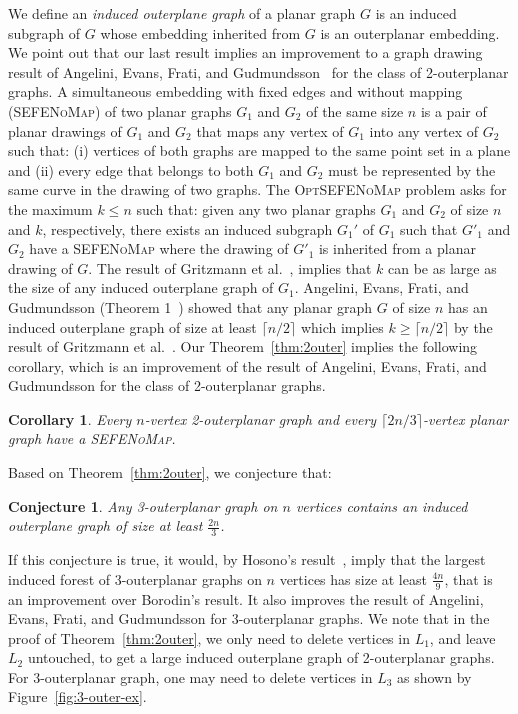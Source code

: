 \documentclass[11pt]{article}
\newtheorem{corollary}[theorem]{Corollary}
\newtheorem{conjecture}[theorem]{Conjecture}
\begin{document}
We define an \emph{induced outerplane graph} of a planar graph $G$ is an induced subgraph of $G$ whose embedding inherited from $G$ is an outerplanar embedding. We point out that our last result implies an improvement to a graph drawing result of  Angelini, Evans, Frati, and Gudmundsson~\cite{AEFG16} for the class of 2-outerplanar graphs. A simultaneous embedding with fixed edges and without mapping (\textsc{SEFENoMap}) of two planar graphs $G_1$ and $G_2$ of the same size $n$ is a pair of planar drawings of $G_1$ and $G_2$ that maps any vertex of $G_1$ into any vertex of $G_2$ such that: (i) vertices of both graphs are mapped to the same point set in a plane and (ii) every edge that belongs to both $G_1$ and $G_2$ must be represented by the same curve in the drawing of two graphs. The \textsc{OptSEFENoMap} problem asks for the maximum $k \leq n$ such that: given any two planar graphs $G_1$ and $G_2$ of size $n$ and $k$, respectively, there exists an induced subgraph $G_1'$ of $G_1$ such that $G'_1$ and $G_2$ have a \textsc{SEFENoMap} where the drawing of $G'_1$ is inherited from a planar drawing of $G$. The result of Gritzmann et al.~\cite{GMPP91}, implies that $k$ can be as large as the size of any induced outerplane graph of $G_1$. Angelini, Evans, Frati, and Gudmundsson (Theorem 1~\cite{AEFG16}) showed that any planar graph $G$ of size $n$ has an induced outerplane graph of size at least $\lceil n/2 \rceil$ which implies $k \geq \lceil n/2 \rceil$ by the result of Gritzmann et al.~\cite{GMPP91}. Our Theorem~\ref{thm:2outer} implies the following corollary, which is an improvement of the result of Angelini, Evans, Frati, and Gudmundsson for the class of 2-outerplanar graphs. 

\begin{corollary}
Every $n$-vertex 2-outerplanar graph and every $\lceil 2n/3 \rceil$-vertex planar graph have a \textsc{SEFENoMap}.
\end{corollary}

\noindent Based on Theorem~\ref{thm:2outer}, we conjecture that:
\begin{conjecture}\label{conj:3-outer}
Any 3-outerplanar graph on $n$ vertices contains an induced outerplane graph of size at least $\frac{2n}{3}$.
\end{conjecture}

If this conjecture is true, it would, by Hosono's result~\cite{Hosono}, imply that the largest induced forest of $3$-outerplanar graphs on $n$ vertices has size at least $\frac{4n}{9}$, that is an improvement over Borodin's result. It also improves the result of Angelini, Evans, Frati, and Gudmundsson for 3-outerplanar graphs. We note that in the proof of Theorem~\ref{thm:2outer}, we only need to delete vertices in $L_1$, and leave $L_2$ untouched, to get a large induced outerplane graph of 2-outerplanar graphs. For $3$-outerplanar graph, one may need to delete vertices in $L_3$ as shown by Figure~\ref{fig:3-outer-ex}.
 
\end{document}
